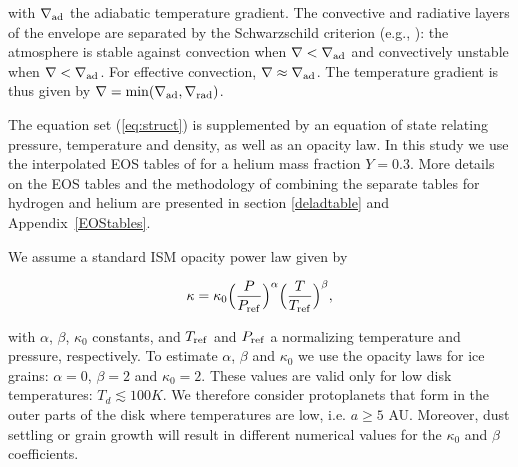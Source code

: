 \documentclass[apj]{emulateapj}
\newcommand{\delad}{\nabla_{\rm ad}}
\newcommand{\delrad}{\nabla_{\rm rad}}
\newcommand{\App}[1]{Appendix~\ref{#1}}
\begin{document}
\noindent with $\delad$ the adiabatic temperature gradient. The convective and radiative layers of the envelope are separated by the Schwarzschild criterion (e.g., \citealt{thompson06}): the atmosphere is stable against convection when $\nabla < \delad$ and convectively unstable when $\nabla < \delad$. For effective convection, $\nabla \approx \delad$.  The temperature gradient is thus given by $\nabla=\mathrm{min}(\delad, \delrad)$. 

The equation set (\ref{eq:struct}) is supplemented by an equation of state relating pressure, temperature and density, as well as an opacity law. In this study we use the interpolated EOS tables of \citet{saumon95} for a helium mass fraction $Y=0.3$. More details on the EOS tables and the methodology of combining the separate tables for hydrogen and helium are presented in section \ref{deladtable} and \App{EOStables}.

We assume a standard ISM opacity power law given by

\begin{equation}
\label{eq:opacitylaw}
\kappa=\kappa_0 \Big(\frac{P}{P_{\rm{ref}}}\Big)^{\alpha} \Big(\frac{T}{T_{\rm{ref}}}\Big)^{\beta},
\end{equation}  

\noindent with $\alpha$, $\beta$, $\kappa_0$ constants, and $T_{\rm{ref}}$ and $P_{\rm{ref}}$ a normalizing temperature and pressure, respectively. To estimate $\alpha$, $\beta$ and $\kappa_0$ we use the \citet{bell94} opacity laws for ice grains: $\alpha =0 $, $\beta=2$ and $\kappa_0=2$. These values are valid only for low disk temperatures: $T_d \lesssim 100 K$.  We therefore consider protoplanets that form in the outer parts of the disk where temperatures are low, i.e. $a \geq 5$ AU. Moreover, dust settling or grain growth will result in different numerical values for the $\kappa_0$ and $\beta$ coefficients.
\end{document}
